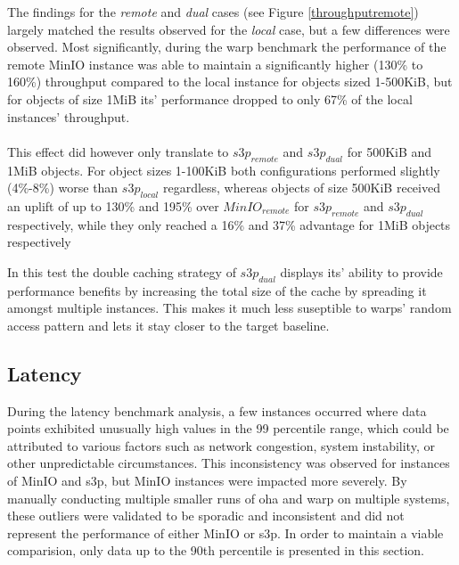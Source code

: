 The findings for the \textit{remote} and \textit{dual} cases (see Figure \ref{throughputremote}) largely matched the results observed for the \textit{local} case, but a few differences were observed. 
Most significantly, during the warp benchmark the performance of the remote MinIO instance was able to maintain a significantly higher (130\% to 160\%) throughput compared to the local instance for objects sized 1-500KiB, but for objects of size 1MiB its' performance dropped to only 67\% of the local instances' throughput.
\\\\
This effect did however only translate to ${s3p}_{remote}$ and ${s3p}_{dual}$ for 500KiB and 1MiB objects. For object sizes 1-100KiB both configurations performed slightly (4\%-8\%) worse than ${s3p}_{local}$ regardless, whereas objects of size 500KiB received an uplift of up to 130\% and 195\% over ${MinIO}_{remote}$ for ${s3p}_{remote}$ and ${s3p}_{dual}$ respectively, while they only reached a 16\% and 37\% advantage for 1MiB objects respectively

In this test the double caching strategy of ${s3p}_{dual}$ displays its' ability to provide performance benefits by increasing the total size of the cache by spreading it amongst multiple instances. This makes it much less suseptible to warps' random access pattern and lets it stay closer to the target baseline.

\subsection{Latency}


During the latency benchmark analysis, a few instances occurred where data points exhibited unusually high values in the 99 percentile range, which could be attributed to various factors such as network congestion, system instability, or other unpredictable circumstances. This inconsistency was observed for instances of MinIO and s3p, but MinIO instances were impacted more severely. By manually conducting multiple smaller runs of oha and warp on multiple systems, these outliers were validated to be sporadic and inconsistent and did not represent the performance of either MinIO or s3p. In order to maintain a viable comparision, only data up to the 90th percentile is presented in this section.

\latlocalminio
{}\latlocalminiooha

